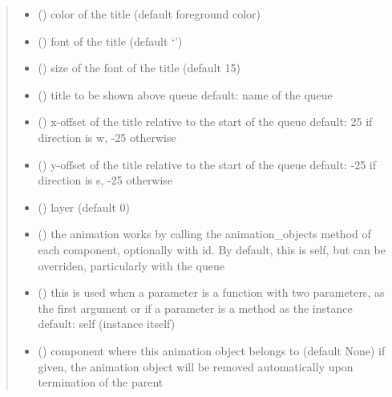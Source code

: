 \documentclass[letterpaper,10pt,english]{sphinxmanual}
\begin{document}
\begin{fulllineitems}
\begin{quote}
\begin{description}
\begin{itemize}
\item {} 
 () \textendash{} color of the title (default foreground color)

\item {} 
 ({\hyperref[\detokenize{Reference:salabim.Animate.font}]{}}) \textendash{} font of the title (default ‘’)

\item {} 
 () \textendash{} size of the font of the title (default 15)

\item {} 
 () \textendash{} title to be shown above queue 
default: name of the queue

\item {} 
 () \textendash{} x-offset of the title relative to the start of the queue 
default: 25 if direction is w, -25 otherwise

\item {} 
 () \textendash{} y-offset of the title relative to the start of the queue 
default: -25 if direction is s, -25 otherwise

\item {} 
 () \textendash{} layer (default 0)

\item {} 
 () \textendash{} the animation works by calling the animation\_objects method of each component, optionally
with id. By default, this is self, but can be overriden, particularly with the queue

\item {} 
 () \textendash{} this is used when a parameter is a function with two parameters, as the first argument or
if a parameter is a method as the instance 
default: self (instance itself)

\item {} 
 ({\hyperref[\detokenize{Reference:salabim.Component}]{}}) \textendash{} component where this animation object belongs to (default None) 
if given, the animation object will be removed
automatically upon termination of the parent


\end{itemize}
\end{description}
\end{quote}
\end{fulllineitems}
\end{document}
